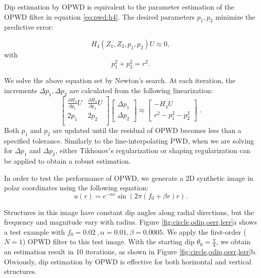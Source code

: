 Dip estimation by OPWD is equivalent to the parameter estimation 
of the OPWD filter in equation \ref{eq:pwd:h4}.
The desired parameters $p_1,p_2$ minimize the predictive error:


\begin{equation}
H_4(Z_1,Z_2,p_1,p_2)U \approx 0,
\end{equation}
with
\begin{equation}
p_1^2+p_2^2=r^2.
\end{equation}

We solve the above equation set by Newton's search.
At each iteration,
the increments $\Delta p_1, \Delta p_2$ are calculated 
from the following linearization:
\begin{equation}
\left[ \begin{array}{cc}
\displaystyle{\frac{\partial H_4}{\partial p_1}U} & 
\displaystyle{\frac{\partial H_4}{\partial p_2}U} \\ 
2p_1 & 2p_2 \\
\end{array}\right]
\left[ \begin{array}{c} 
\Delta p_1 \\ \Delta p_2 
\end{array}\right] \approx
\left[ \begin{array}{c} 
-H_4U \\
r^2-p_1^2-p_2^2
\end{array}\right]\;.
\end{equation} 
Both $p_1$ and $p_2$ are updated until the residual of OPWD becomes 
less than a specified tolerance.
Similarly to the line-interpolating PWD,
when we are solving for $\Delta p_1$ and $\Delta p_2$, 
either Tikhonov's regularization \cite[]{fomel:1946} or
shaping regularization \cite[]{fomel:R29} 
can be applied to obtain a robust estimation.

In order to test the performance of OPWD,
we generate a 2D synthetic image 
in polar coordinates using the following equation:
\begin{equation}\label{eq:chirp}
u(r)=e^{-\alpha r}\sin(2\pi (f_0+\beta r)r).
\end{equation}

Structures in this image have constant dip angles along radial directions,
but the frequency and magnitude vary with radius.
Figure \ref{fig:circle,odip,oerr,lerr}a shows a test example 
with $f_0=0.02~,\alpha=0.01,\beta=0.0005$. 
We apply the 
first-order ($N=1$) OPWD filter to this test image.
With the starting dip $\theta_0=\frac{\pi}{4}$,
we obtain an estimation result in 10 iterations,
as shown in Figure \ref{fig:circle,odip,oerr,lerr}b.
Obviously, dip estimation by OPWD is effective 
for both horizontal and vertical structures.

